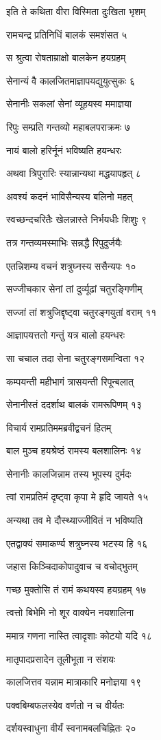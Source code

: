 इति ते कथिता वीरा विस्मिता दुःखिता भृशम्

रामचन्द्र प्रतिनिधिं बालकं समशंसत ५

स श्रुत्वा रोषताम्राक्षो बालकेन हयग्रहम्

सेनान्यं वै कालजितमाज्ञापयद्युयुत्सुकः ६

सेनानीः सकलां सेनां व्यूहयस्व ममाज्ञया

रिपुः सम्प्रति गन्तव्यो महाबलपराक्रमः ७

नायं बालो हरिर्नूनं भविष्यति हयन्धरः

अथवा त्रिपुरारिः स्यान्नान्यथा मद्धयापहृत् ८

अवश्यं कदनं भाविसैन्यस्य बलिनो महत्

स्वच्छन्दचरितैः खेलन्नास्ते निर्भयधीः शिशुः ९

तत्र गन्तव्यमस्माभिः सन्नद्धै रिपुदुर्जयैः

एतन्निशम्य वचनं शत्रुघ्नस्य ससैन्यपः १०

सज्जीचकार सेनां तां दुर्व्यूढां चतुरङ्गिणीम्

सज्जां तां शत्रुजिद्दृष्ट्वा चतुरङ्गयुतां वराम् ११

आज्ञापयत्ततो गन्तुं यत्र बालो हयन्धरः

सा चचाल तदा सेना चतुरङ्गसमन्विता १२

कम्पयन्ती महीभागं त्रासयन्ती रिपून्बलात्

सेनानीस्तं ददर्शाथ बालकं रामरूपिणम् १३

विचार्य रामप्रतिममब्रवीद्वचनं हितम्

बाल मुञ्च हयश्रेष्ठं रामस्य बलशालिनः १४

सेनानीः कालजिन्नाम तस्य भूपस्य दुर्मदः

त्वां रामप्रतिमं दृष्ट्वा कृपा मे हृदि जायते १५

अन्यथा तव मे दौस्थ्याज्जीवितं न भविष्यति

एतद्वाक्यं समाकर्ण्य शत्रुघ्नस्य भटस्य हि १६

जहास किञ्चिदाकोपादुवाच च वचोद्भुतम्

गच्छ मुक्तोसि तं रामं कथयस्व हयग्रहम् १७

त्वत्तो बिभेमि नो शूर वाक्येन नयशालिना

ममात्र गणना नास्ति त्वादृशाः कोटयो यदि १८

मातृपादप्रसादेन तूलीभूता न संशयः

कालजित्तव यन्नाम मात्राकारि मनोज्ञया १९

पक्वबिम्बफलस्येव वर्णतो न च वीर्यतः

दर्शयस्वाधुना वीर्यं स्वनामबलचिह्नितः २०

